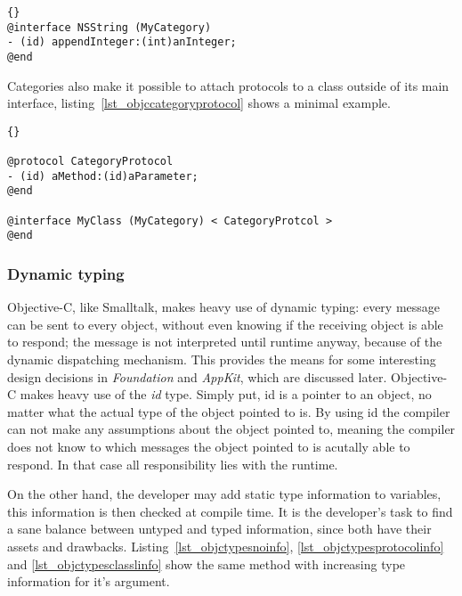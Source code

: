 \begin{lstlisting}[captionpos=b, caption=An Objective-C category added to the
NSString class., label=lst_objccategory]{}
@interface NSString (MyCategory)
- (id) appendInteger:(int)anInteger;
@end
\end{lstlisting}

Categories also make it possible to attach protocols to a class outside of its
main interface, listing~\ref{lst_objccategoryprotocol} shows a minimal example.

\begin{lstlisting}[captionpos=b, caption=Attaching a protocol to an existing
class by the means of a category., label=lst_objccategoryprotocol]{}

@protocol CategoryProtocol
- (id) aMethod:(id)aParameter;
@end

@interface MyClass (MyCategory) < CategoryProtcol >
@end

\end{lstlisting}

\subsubsection{Dynamic typing}
Objective-C, like Smalltalk, makes heavy use of dynamic typing: every message
can be sent to every object, without even knowing if the receiving object is
able to respond; the message is not interpreted until runtime anyway, because
of the dynamic dispatching mechanism. This provides the means for some
interesting design decisions in \textit{Foundation} and \textit{AppKit}, which
are discussed later. 
Objective-C makes heavy use of the \textit{id} type. Simply put, id is a pointer
to an object, no matter what the actual type of the object pointed to is. By
using id the compiler can not make any assumptions about the object pointed to,
meaning the compiler does not know to which messages the object pointed to is
acutally able to respond. In that case all responsibility lies with the runtime.

On the other hand, the developer may add static type information to variables,
this information is then checked at compile time. It is the developer's task to
find a sane balance between untyped and typed information, since both have their
assets and drawbacks. Listing~\ref{lst_objctypesnoinfo},
\ref{lst_objctypesprotocolinfo} and \ref{lst_objctypesclasslinfo} show the same
method with increasing type information for it's argument.

